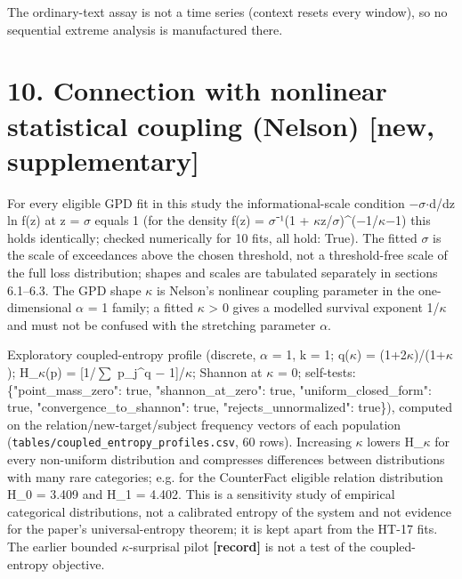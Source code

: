 \documentclass[10pt,a4paper]{article}
\begin{document}
The ordinary-text assay is not a time series (context resets every window), so no sequential extreme analysis is manufactured there.



\section*{10. Connection with nonlinear statistical coupling (Nelson) [new, supplementary]}



For every eligible GPD fit in this study the informational-scale condition $-$$\sigma$$\cdot$d/dz ln f(z) at z = $\sigma$ equals 1 (for the density f(z) = $\sigma$⁻¹(1 + $\kappa$z/$\sigma$)\textasciicircum{}($-$1/$\kappa$$-$1) this holds identically; checked numerically for 10 fits, all hold: True). The fitted $\sigma$ is the scale of exceedances above the chosen threshold, not a threshold-free scale of the full loss distribution; shapes and scales are tabulated separately in sections 6.1–6.3. The GPD shape $\kappa$ is Nelson's nonlinear coupling parameter in the one-dimensional $\alpha$ = 1 family; a fitted $\kappa$ > 0 gives a modelled survival exponent 1/$\kappa$ and must not be confused with the stretching parameter $\alpha$.



Exploratory coupled-entropy profile (discrete, $\alpha$ = 1, k = 1; q($\kappa$) = (1+2$\kappa$)/(1+$\kappa$); H\_$\kappa$(p) = [1/$\sum$ p\_j\textasciicircum{}q $-$ 1]/$\kappa$; Shannon at $\kappa$ = 0; self-tests: \{"point\_mass\_zero": true, "shannon\_at\_zero": true, "uniform\_closed\_form": true, "convergence\_to\_shannon": true, "rejects\_unnormalized": true\}), computed on the relation/new-target/subject frequency vectors of each population (\texttt{tables/coupled\_entropy\_profiles.csv}, 60 rows). Increasing $\kappa$ lowers H\_$\kappa$ for every non-uniform distribution and compresses differences between distributions with many rare categories; e.g. for the CounterFact eligible relation distribution H\_0 = 3.409 and H\_1 = 4.402. This is a sensitivity study of empirical categorical distributions, not a calibrated entropy of the system and not evidence for the paper's universal-entropy theorem; it is kept apart from the HT-17 fits. The earlier bounded $\kappa$-surprisal pilot \textbf{[record]} is not a test of the coupled-entropy objective.
\end{document}
